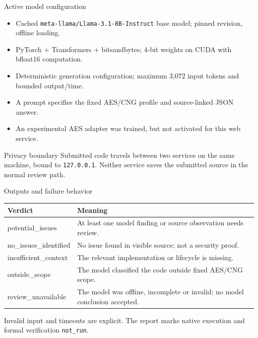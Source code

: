 \documentclass[aspectratio=169,10pt]{beamer}
\begin{document}
\begin{frame}{Active model configuration}
\begin{itemize}
\item Cached \texttt{meta-llama/Llama-3.1-8B-Instruct} base model; pinned revision, offline loading.
\item PyTorch + Transformers + bitsandbytes; 4-bit weights on CUDA with bfloat16 computation.
\item Deterministic generation configuration; maximum 3,072 input tokens and bounded output/time.
\item A prompt specifies the fixed AES/CNG profile and source-linked JSON answer.
\item An experimental AES adapter was trained, but not activated for this web service.
\end{itemize}
\begin{block}{Privacy boundary}
Submitted code travels between two services on the same machine, bound to \texttt{127.0.0.1}. Neither service saves the submitted source in the normal review path.
\end{block}
\end{frame}

\begin{frame}{Outputs and failure behavior}
\small
\begin{tabularx}{\textwidth}{>{\ttfamily}p{4.2cm}X}
\toprule
Verdict & Meaning \\
\midrule
potential\_issues & At least one model finding or source observation needs review. \\
no\_issues\_identified & No issue found in visible source; not a security proof. \\
insufficient\_context & The relevant implementation or lifecycle is missing. \\
outside\_scope & The model classified the code outside fixed AES/CNG scope. \\
review\_unavailable & The model was offline, incomplete or invalid; no model conclusion accepted. \\
\bottomrule
\end{tabularx}
\vspace{0.7em}
Invalid input and timeouts are explicit. The report marks native execution and formal verification \texttt{not\_run}.
\end{frame}
\end{document}
